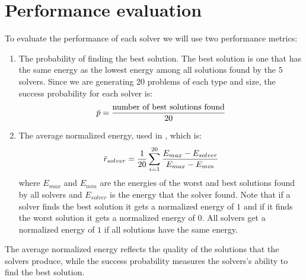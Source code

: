 

\section{Performance evaluation}
To evaluate the performance of each solver we will use two performance metrics:
\begin{enumerate}
    \item The probability of finding the best solution. The best solution is one that has the same energy as the lowest energy among all solutions found by the $5$ solvers. Since we are generating $20$ problems of each type and size, the success probability for each solver is:
    \begin{equation}
        \Bar{p} = \frac{\text{number of best solutions found}}{20}
    \end{equation}
    \item The average normalized energy, used in \cite{b34}, which is:
    \begin{equation}
        \Bar{r}_{solver} =  \frac{1}{20} \sum_{i = 1}^{20} \frac{E_{max} - E_{solver}}{E_{max} - E_{min}}
    \end{equation}
    where $E_{max}$ and $E_{min}$ are the energies of the worst and best solutions found by all solvers and $E_{solver}$ is the energy that the solver found. Note that if a solver finds the best solution it gets a normalized energy of $1$ and if it finds the worst solution it gets a normalized energy of $0$. All solvers get a normalized energy of $1$ if all solutions have the same energy.
\end{enumerate}

The average normalized energy reflects the quality of the solutions that the solvers produce, while the success probability measures the solvers's ability to find the best solution.